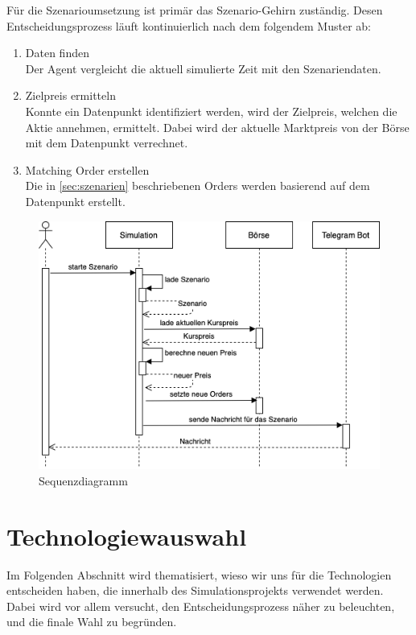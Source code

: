 Für die Szenarioumsetzung ist primär das Szenario-Gehirn zuständig. Desen Entscheidungsprozess läuft kontinuierlich nach dem folgendem Muster ab:
\begin{enumerate}
    \item Daten finden\\
        Der Agent vergleicht die aktuell simulierte Zeit mit den Szenariendaten.
    \item Zielpreis ermitteln\\
        Konnte ein Datenpunkt identifiziert werden, wird der Zielpreis, welchen die Aktie annehmen, ermittelt. Dabei wird der aktuelle Marktpreis von der Börse mit dem Datenpunkt verrechnet.
    \item Matching Order erstellen\\
        Die in \autoref{sec:szenarien} beschriebenen Orders werden basierend auf dem Datenpunkt erstellt.
\end{enumerate}

\begin{figure}[ht]
    \includegraphics[width=\textwidth]{img/Sequenzdiagramm.png}
    \centering
    \caption{Sequenzdiagramm}
    \label{fig:Sequenzdiagramm}
\end{figure}


\section{Technologiewauswahl}

Im Folgenden Abschnitt wird thematisiert, wieso wir uns für die Technologien entscheiden haben, die innerhalb des Simulationsprojekts verwendet werden. Dabei wird vor allem versucht, den Entscheidungsprozess näher zu beleuchten, und die finale Wahl zu begründen.


